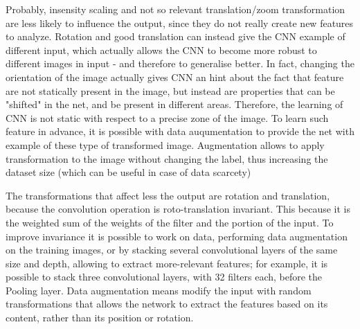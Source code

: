 \begin{box-stud}
    Probably, insensity scaling and not so relevant translation/zoom transformation are less likely to influence the output, since they do not really create new features to analyze. Rotation and good translation can instead give the CNN example of different input, which actually allows the CNN to become more robust to different images in input - and therefore to generalise better. In fact, changing the orientation of the image actually gives CNN an hint about the fact that feature are not statically present in the image, but instead are properties that can be "shifted" in the net, and be present in different areas. Therefore, the learning of CNN is not static with respect to a precise zone of the image. To learn such feature in advance, it is possible with data auqumentation to provide the net with example of these type of transformed image. Augmentation allows to apply transformation to the image without changing the label, thus increasing the dataset size (which can be useful in case of data scarcety)
\end{box-stud}

\begin{box-stud}
    The transformations that affect less the output are rotation and translation, because the convolution operation is roto-translation invariant. This because it is the weighted sum of the weights of the filter and the portion of the input. To improve invariance it is possible to work on data, performing data augmentation on the training images, or by stacking several convolutional layers of the same size and depth, allowing to extract more-relevant features; for example, it is possible to stack three convolutional layers, with 32 filters each, before the Pooling layer. Data augmentation means modify the input with random transformations that allows the network to extract the features based on its content, rather than its position or rotation.
\end{box-stud}




